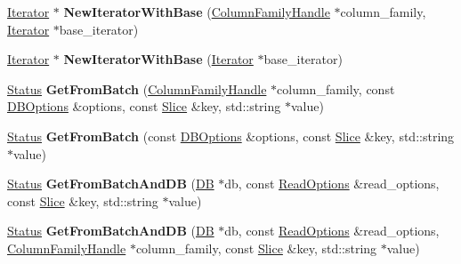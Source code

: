 \begin{DoxyCompactItemize}
\item 
\hyperlink{classrocksdb_1_1Iterator}{Iterator} $\ast$ {\bfseries New\+Iterator\+With\+Base} (\hyperlink{classrocksdb_1_1ColumnFamilyHandle}{Column\+Family\+Handle} $\ast$column\+\_\+family, \hyperlink{classrocksdb_1_1Iterator}{Iterator} $\ast$base\+\_\+iterator)\hypertarget{classrocksdb_1_1WriteBatchWithIndex_a4cc367c9b6b2432bb3e5b001ec825695}{}\label{classrocksdb_1_1WriteBatchWithIndex_a4cc367c9b6b2432bb3e5b001ec825695}

\item 
\hyperlink{classrocksdb_1_1Iterator}{Iterator} $\ast$ {\bfseries New\+Iterator\+With\+Base} (\hyperlink{classrocksdb_1_1Iterator}{Iterator} $\ast$base\+\_\+iterator)\hypertarget{classrocksdb_1_1WriteBatchWithIndex_a5c5ae5be74f4dc481bebf24255a3d394}{}\label{classrocksdb_1_1WriteBatchWithIndex_a5c5ae5be74f4dc481bebf24255a3d394}

\item 
\hyperlink{classrocksdb_1_1Status}{Status} {\bfseries Get\+From\+Batch} (\hyperlink{classrocksdb_1_1ColumnFamilyHandle}{Column\+Family\+Handle} $\ast$column\+\_\+family, const \hyperlink{structrocksdb_1_1DBOptions}{D\+B\+Options} \&options, const \hyperlink{classrocksdb_1_1Slice}{Slice} \&key, std\+::string $\ast$value)\hypertarget{classrocksdb_1_1WriteBatchWithIndex_aee56706c39cc7df1b23990c9c2e17957}{}\label{classrocksdb_1_1WriteBatchWithIndex_aee56706c39cc7df1b23990c9c2e17957}

\item 
\hyperlink{classrocksdb_1_1Status}{Status} {\bfseries Get\+From\+Batch} (const \hyperlink{structrocksdb_1_1DBOptions}{D\+B\+Options} \&options, const \hyperlink{classrocksdb_1_1Slice}{Slice} \&key, std\+::string $\ast$value)\hypertarget{classrocksdb_1_1WriteBatchWithIndex_a751a2f10088e6a4da8b7bdfbba3b88c2}{}\label{classrocksdb_1_1WriteBatchWithIndex_a751a2f10088e6a4da8b7bdfbba3b88c2}

\item 
\hyperlink{classrocksdb_1_1Status}{Status} {\bfseries Get\+From\+Batch\+And\+DB} (\hyperlink{classrocksdb_1_1DB}{DB} $\ast$db, const \hyperlink{structrocksdb_1_1ReadOptions}{Read\+Options} \&read\+\_\+options, const \hyperlink{classrocksdb_1_1Slice}{Slice} \&key, std\+::string $\ast$value)\hypertarget{classrocksdb_1_1WriteBatchWithIndex_a4c4f01aad704cfce660e4e12dcadcfee}{}\label{classrocksdb_1_1WriteBatchWithIndex_a4c4f01aad704cfce660e4e12dcadcfee}

\item 
\hyperlink{classrocksdb_1_1Status}{Status} {\bfseries Get\+From\+Batch\+And\+DB} (\hyperlink{classrocksdb_1_1DB}{DB} $\ast$db, const \hyperlink{structrocksdb_1_1ReadOptions}{Read\+Options} \&read\+\_\+options, \hyperlink{classrocksdb_1_1ColumnFamilyHandle}{Column\+Family\+Handle} $\ast$column\+\_\+family, const \hyperlink{classrocksdb_1_1Slice}{Slice} \&key, std\+::string $\ast$value)\hypertarget{classrocksdb_1_1WriteBatchWithIndex_a5f19484b5f3ce5a1ec831b750f020f5d}{}\label{classrocksdb_1_1WriteBatchWithIndex_a5f19484b5f3ce5a1ec831b750f020f5d}


\end{DoxyCompactItemize}

